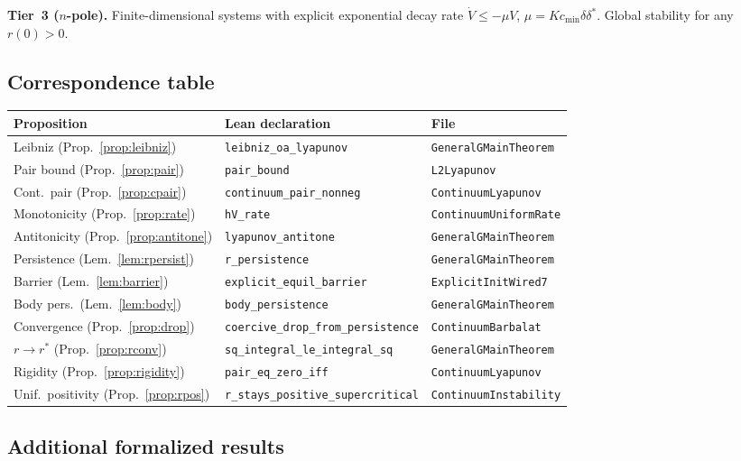 \documentclass[11pt,a4paper]{article}
\theoremstyle{definition}
\begin{document}
\medskip\noindent\textbf{Tier~3 ($n$-pole).} Finite-dimensional systems with explicit exponential decay rate $\dot V\leq -\mu V$, $\mu = Kc_{\min}\delta\delta^*$. Global stability for any $r(0)>0$.

\subsection{Correspondence table}

\begin{center}\small
\begin{tabular}{@{}lll@{}}
\textbf{Proposition} & \textbf{Lean declaration} & \textbf{File} \\
\hline
Leibniz (Prop.~\ref{prop:leibniz}) & \texttt{leibniz\_oa\_lyapunov} & \texttt{GeneralGMainTheorem} \\
Pair bound (Prop.~\ref{prop:pair}) & \texttt{pair\_bound} & \texttt{L2Lyapunov} \\
Cont.\ pair (Prop.~\ref{prop:cpair}) & \texttt{continuum\_pair\_nonneg} & \texttt{ContinuumLyapunov} \\
Monotonicity (Prop.~\ref{prop:rate}) & \texttt{hV\_rate} & \texttt{ContinuumUniformRate} \\
Antitonicity (Prop.~\ref{prop:antitone}) & \texttt{lyapunov\_antitone} & \texttt{GeneralGMainTheorem} \\
Persistence (Lem.~\ref{lem:rpersist}) & \texttt{r\_persistence} & \texttt{GeneralGMainTheorem} \\
Barrier (Lem.~\ref{lem:barrier}) & \texttt{explicit\_equil\_barrier} & \texttt{ExplicitInitWired7} \\
Body pers.\ (Lem.~\ref{lem:body}) & \texttt{body\_persistence} & \texttt{GeneralGMainTheorem} \\
Convergence (Prop.~\ref{prop:drop}) & \texttt{coercive\_drop\_from\_persistence} & \texttt{ContinuumBarbalat} \\
$r\to r^*$ (Prop.~\ref{prop:rconv}) & \texttt{sq\_integral\_le\_integral\_sq} & \texttt{GeneralGMainTheorem} \\
Rigidity (Prop.~\ref{prop:rigidity}) & \texttt{pair\_eq\_zero\_iff} & \texttt{ContinuumLyapunov} \\
Unif.\ positivity (Prop.~\ref{prop:rpos}) & \texttt{r\_stays\_positive\_supercritical} & \texttt{ContinuumInstability}
\end{tabular}
\end{center}

\subsection{Additional formalized results}
\end{document}
